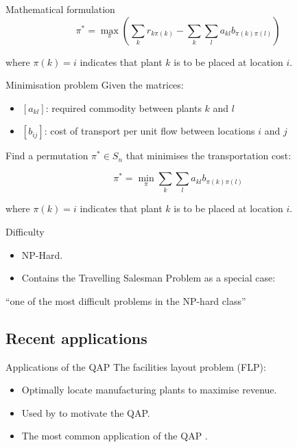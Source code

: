 {{\begin{frame}{Mathematical formulation}
            \[ \pi^{*} = \max_{\pi} \left(\sum_{k}{r_{k\pi(k)}} - \sum_{k}\sum_{l}{a_{kl}b_{\pi(k)\pi(l)}}\right) \]

            where  \(\pi(k) = i\) indicates that plant \(k\) is to be placed at location \(i\).
        \end{frame}

        \begin{frame}{Minimisation problem}
            Given the matrices:
            \begin{itemize}
                \item \([a_{kl}]\): required commodity  between plants \(k\) and \(l\)
                \item \([b_{ij}]\): cost of transport per unit flow between locations \(i\) and \(j\)
            \end{itemize}

            Find a permutation \(\pi^{*} \in S_n\) that minimises the transportation cost:

            \[ \pi^{*} = \min_{\pi} \sum_{k}\sum_{l}{a_{kl}b_{\pi(k)\pi(l)}} \]

            where  \(\pi(k) = i\) indicates that plant \(k\) is to be placed at location \(i\).
        \end{frame}

        \begin{frame}{Difficulty}
            \begin{itemize}
                \item NP-Hard.
                \item Contains the Travelling Salesman Problem as a special case:
            \end{itemize}


            \vspace{0.6cm}

            \begin{center}
                ``one of the most difficult problems in the NP-hard class'' \citep{Loiola:2007jk}
            \end{center}
        \end{frame}
    }

    \subsection{Recent applications} {
        \begin{frame}{Applications of the QAP}
            The facilities layout problem (FLP):
            \begin{itemize}
                \item Optimally locate manufacturing plants to maximise revenue.
                \item Used by \citeauthor{Koopmans:1957gf} to motivate the QAP.
                \item The most common application of the QAP \citep{Loiola:2007jk}.
            \end{itemize}


\end{frame}}}
